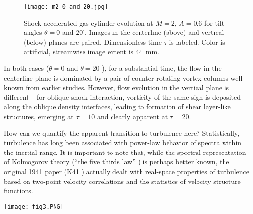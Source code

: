 \documentclass[preprint,superscriptaddress,showpacs]{revtex4-1}
\begin{document}
\begin{figure}
\centerline{\texttt{[image: m2\_0\_and\_20.jpg]}}
\caption{\label{pretty} Shock-accelerated gas cylinder evolution at $M=2$, $A=0.6$ 
for tilt angles $\theta = 0$ and $20^\circ$. Images in the centerline (above) and vertical (below)
planes are paired. Dimensionless time $\tau$ is labeled. 
Color is artificial, streamwise image extent is 44~mm.}
\end{figure}

In both cases ($\theta = 0$ and $\theta = 20^\circ$), for a substantial time, 
the flow in the centerline plane is 
dominated by a pair of counter-rotating vortex columns well-known from earlier studies. 
However, flow evolution in the vertical plane is different -- for oblique shock interaction,
vorticity of the same sign is deposited along the oblique density interfaces, leading to 
formation of shear layer-like structures, emerging at $\tau=10$ and clearly 
apparent at $\tau=20$. 

How can we quantify the apparent transition to turbulence here? 
Statistically, turbulence has long been associated with power-law behavior of spectra
within the inertial range. 
It is important to note that, while the spectral representation of Kolmogorov theory 
(``the five thirds law'' \cite{kolmogorov1962refinement}) is perhaps better known, 
the original 1941 paper (K41 \cite{k41}) 
 actually dealt with real-space properties of turbulence based on two-point velocity
correlations and the statistics of velocity structure functions.


\begin{figure*}[!htbp]
\centerline{\texttt{[image: fig3.PNG]}}
\caption{\label{fig2} Second-order structure functions of fluorescence intensity $I_2(r)$ in images shown
in Fig.~\protect\ref{pretty}. The values of the structure functions are normalized by their maxima, $r$ 
is scaled by the injection nozzle diameter $D_{IC}$. The plots are color-coded by dimensionless times $\tau$.
Power-law scalings with exponents 2, 1, and 2/3 are shown as guides to the eye.
}
\end{figure*}
\end{document}
